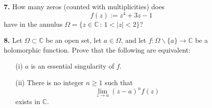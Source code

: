 \documentclass[12pt]{article}
\begin{document}
\begin{itemize}
\item[{\bf 7.}] How many zeros (counted with multiplicities) does
$$f(z):=z^4+3z-1$$
have in the annulus
$\Omega=\{z\in\mathbb{C}\,:\,1<|z|<2\}$?


\item[{\bf 8.}]
Let $\Omega\subset\mathbb{C}$ be an open set, let $a\in\Omega$, and let
$f:\Omega\smallsetminus\{a\}\to\mathbb{C}$ be a holomorphic  function. Prove
that the following are equivalent:
\begin{itemize}
\item[(i)] $a$ is an essential singularity of $f$.
\item[(ii)] There is no integer $n\geq 1$ such that
$$\lim_{z\to a}(z-a)^nf(z)$$
exists in $\mathbb{C}$.
\end{itemize}

\end{itemize}
\end{document}
